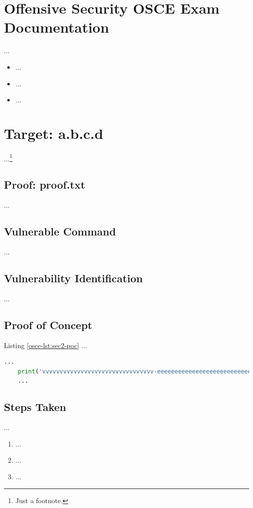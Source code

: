 %
%
%
\section{Offensive Security OSCE Exam Documentation}\label{osce-sec:sec1}
%
...

\begin{itemize}
    \item ...
    \item ...
    \item ...
\end{itemize}
%
%
%
\section{Target: a.b.c.d}\label{osce-sec:sec2}
%
...\footnote{Just a footnote.}
%
%
%
\subsection{Proof: proof.txt}\label{osce-sec:sec2-proof}
%
...
%
%
%
\subsection{Vulnerable Command}\label{osce-sec:sec2-vulncmd}
%
...~\cite{MitreAttack}
%
%
%
\subsection{Vulnerability Identification}\label{osce-sec:sec2-vulnid}
%
...
%
%
%
\subsection{Proof of Concept}\label{osce-sec:sec2-poc}
%
Listing \ref{osce-lst:sec2-poc} ...\\

\begin{lstlisting}[language=Python,caption={Proof of Concept}, label={osce-lst:sec2-poc}]
    ...
    print('vvvvvvvvvvvvvvvvvvvvvvvvvvvvvvvv-eeeeeeeeeeeeeeeeeeeeeeeeeeeeeeeeeeeeeeeeeee-looooooooooooooooooooooong-striiiiiiiiiiiiiing')
    ...
\end{lstlisting}
%
%
%
\subsection{Steps Taken}\label{osce-sec:sec2-steps}
%
...

\begin{enumerate}
    \item ...
    \item ...
    \item ...
\end{enumerate}
%
%
%
